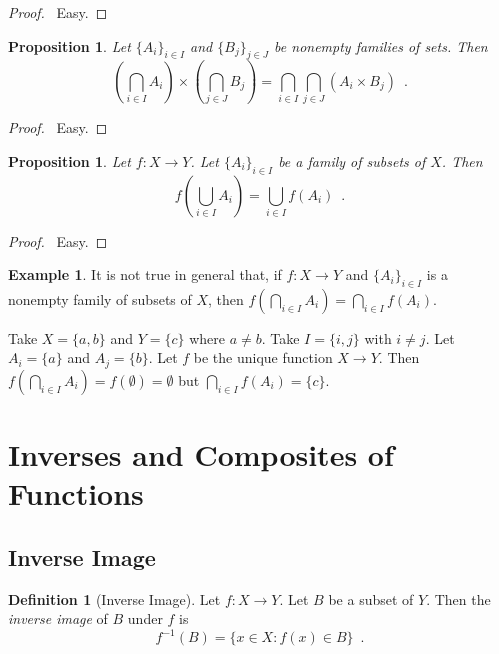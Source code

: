 \documentclass{report}
\let\qed\relax
\newtheorem{prop}[ax]{Proposition}
\theoremstyle{definition}
\newtheorem{df}[ax]{Definition}
\newtheorem{ex}[ax]{Example}
\begin{document}
\begin{proof}
\pf\ Easy. \qed
\end{proof}

\begin{prop}
Let $\{A_i\}_{i \in I}$ and $\{B_j\}_{j \in J}$ be nonempty families of sets. Then
\[ \left( \bigcap_{i \in I} A_i \right) \times \left( \bigcap_{j \in J} B_j \right) = \bigcap_{i \in I} \bigcap_{j \in J} (A_i \times B_j) \enspace . \]
\end{prop}

\begin{proof}
\pf\ Easy. \qed
\end{proof}

\begin{prop}
Let $f : X \rightarrow Y$. Let $\{A_i\}_{i \in I}$ be a family of subsets of $X$. Then
\[ f \left( \bigcup_{i \in I} A_i \right) = \bigcup_{i \in I} f(A_i) \enspace . \]
\end{prop}

\begin{proof}
\pf\ Easy. \qed
\end{proof}

\begin{ex}
It is not true in general that, if $f : X \rightarrow Y$ and $\{A_i\}_{i \in I}$ is a nonempty family of subsets of $X$, then $f \left( \bigcap_{i \in I} A_i \right) = \bigcap_{i \in I} f(A_i)$.

Take $X = \{a,b\}$ and $Y = \{c\}$ where $a \neq b$. Take $I = \{i,j\}$ with $i \neq j$. Let $A_i = \{a\}$ and $A_j = \{b\}$. Let $f$ be the unique function $X \rightarrow Y$. Then $f \left( \bigcap_{i \in I} A_i \right) = f(\emptyset) = \emptyset$ but $\bigcap_{i \in I} f(A_i) = \{c\}$.
\end{ex}

\section{Inverses and Composites of Functions}

\subsection{Inverse Image}

\begin{df}[Inverse Image]
Let $f : X \rightarrow Y$. Let $B$ be a subset of $Y$. Then the \emph{inverse image} of $B$ under $f$ is
\[ f^{-1}(B) = \{ x \in X : f(x) \in B \} \enspace . \]
\end{df}
\end{document}
